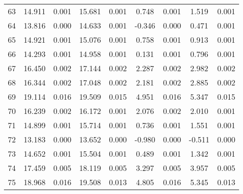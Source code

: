 \documentclass[10pt]{article}
\begin{document}
\begin{longtable}[c]{ccccc|cccc}
63 & \cellcolor{ gray!10 }  14.911 &  0.001 & \cellcolor{ gray!10 }  15.681 &  0.001 & \cellcolor{ gray!10 }  0.748 &  0.001 & \cellcolor{ gray!10 }  1.519 &  0.001 \\
64 & \cellcolor{ gray!10 }  13.816 &  0.000 & \cellcolor{ gray!10 }  14.633 &  0.001 & \cellcolor{ gray!10 } -0.346 &  0.000 & \cellcolor{ gray!10 }  0.471 &  0.001 \\
65 & \cellcolor{ gray!10 }  14.921 &  0.001 & \cellcolor{ gray!10 }  15.076 &  0.001 & \cellcolor{ gray!10 }  0.758 &  0.001 & \cellcolor{ gray!10 }  0.913 &  0.001 \\
66 & \cellcolor{ gray!10 }  14.293 &  0.001 & \cellcolor{ gray!10 }  14.958 &  0.001 & \cellcolor{ gray!10 }  0.131 &  0.001 & \cellcolor{ gray!10 }  0.796 &  0.001 \\
67 & \cellcolor{ gray!10 }  16.450 &  0.002 & \cellcolor{ gray!10 }  17.144 &  0.002 & \cellcolor{ gray!10 }  2.287 &  0.002 & \cellcolor{ gray!10 }  2.982 &  0.002 \\
68 & \cellcolor{ gray!10 }  16.344 &  0.002 & \cellcolor{ gray!10 }  17.048 &  0.002 & \cellcolor{ gray!10 }  2.181 &  0.002 & \cellcolor{ gray!10 }  2.885 &  0.002 \\
69 & \cellcolor{ gray!10 }  19.114 &  0.016 & \cellcolor{ gray!10 }  19.509 &  0.015 & \cellcolor{ gray!10 }  4.951 &  0.016 & \cellcolor{ gray!10 }  5.347 &  0.015 \\
70 & \cellcolor{ gray!10 }  16.239 &  0.002 & \cellcolor{ gray!10 }  16.172 &  0.001 & \cellcolor{ gray!10 }  2.076 &  0.002 & \cellcolor{ gray!10 }  2.010 &  0.001 \\
71 & \cellcolor{ gray!10 }  14.899 &  0.001 & \cellcolor{ gray!10 }  15.714 &  0.001 & \cellcolor{ gray!10 }  0.736 &  0.001 & \cellcolor{ gray!10 }  1.551 &  0.001 \\
72 & \cellcolor{ gray!10 }  13.183 &  0.000 & \cellcolor{ gray!10 }  13.652 &  0.000 & \cellcolor{ gray!10 } -0.980 &  0.000 & \cellcolor{ gray!10 } -0.511 &  0.000 \\
73 & \cellcolor{ gray!10 }  14.652 &  0.001 & \cellcolor{ gray!10 }  15.504 &  0.001 & \cellcolor{ gray!10 }  0.489 &  0.001 & \cellcolor{ gray!10 }  1.342 &  0.001 \\
74 & \cellcolor{ gray!10 }  17.459 &  0.005 & \cellcolor{ gray!10 }  18.119 &  0.005 & \cellcolor{ gray!10 }  3.297 &  0.005 & \cellcolor{ gray!10 }  3.957 &  0.005 \\
75 & \cellcolor{ gray!10 }  18.968 &  0.016 & \cellcolor{ gray!10 }  19.508 &  0.013 & \cellcolor{ gray!10 }  4.805 &  0.016 & \cellcolor{ gray!10 }  5.345 &  0.013 \\

\end{longtable}
\end{document}
